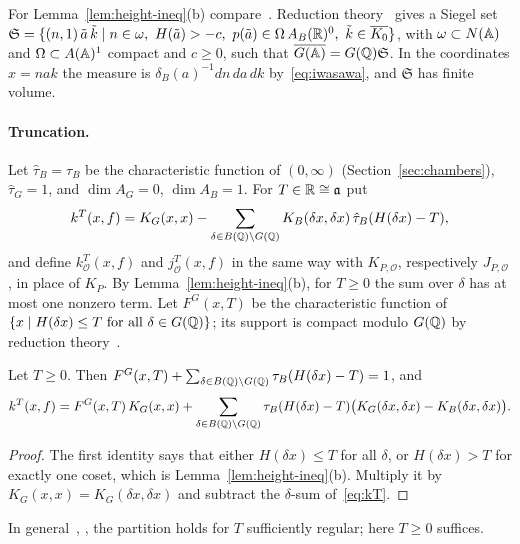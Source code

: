 For Lemma~\ref{lem:height-ineq}(b) compare~\cite[Lemma~5.1]{Ar78}.
Reduction theory~\cite{Go62} gives a Siegel set
$\mathfrak S=\{(n,1)\,\tilde a\,\tilde k\mid n\in\omega,\ H(\tilde a)>-c,\
p(\tilde a)\in\Omega\,A_B(\mathbb{R})^0,\ \tilde k\in\overline{K_0}\}$, with
$\omega\subset N(\mathbb{A})$ and $\Omega\subset A(\mathbb{A})^1$ compact and $c\ge0$, such
that $\overline{G(\mathbb{A})}=G(\mathbb{Q})\mathfrak S$. In the coordinates $x=nak$ the measure
is $\delta_B(a)^{-1}dn\,da\,dk$ by~\eqref{eq:iwasawa}, and $\mathfrak S$ has
finite volume.

\paragraph{Truncation.} Let $\hat\tau_B=\tau_B$ be the characteristic
function of $(0,\infty)$ (Section~\ref{sec:chambers}), $\hat\tau_G=1$, and
$\dim A_G=0$, $\dim A_B=1$. For $T\in\mathbb{R}\cong\mathfrak a$ put
\begin{equation}\label{eq:kT}
k^T(x,f)=K_G(x,x)-\sum_{\delta\in B(\mathbb{Q})\backslash G(\mathbb{Q})}
K_B(\delta x,\delta x)\,\hat\tau_B(H(\delta x)-T),
\end{equation}
and define $k^T_{\mathcal O}(x,f)$ and $j^T_{\mathcal O}(x,f)$ in the same
way with $K_{P,\mathcal O}$, respectively $J_{P,\mathcal O}$, in place of
$K_P$. By Lemma~\ref{lem:height-ineq}(b), for $T\ge0$ the sum over
$\delta$ has at most one nonzero term. Let $F^G(x,T)$ be the
characteristic function of $\{x\mid H(\delta x)\le T\ \text{for all}\
\delta\in G(\mathbb{Q})\}$; its support is compact modulo $G(\mathbb{Q})$ by reduction
theory~\cite{Go62}.

\begin{lemma}\label{lem:partition}
Let $T\ge0$. Then $F^G(x,T)+\sum_{\delta\in B(\mathbb{Q})\backslash G(\mathbb{Q})}
\tau_B(H(\delta x)-T)=1$, and
\begin{equation}\label{eq:kT-split}
k^T(x,f)=F^G(x,T)\,K_G(x,x)+\sum_{\delta\in B(\mathbb{Q})\backslash G(\mathbb{Q})}
\tau_B(H(\delta x)-T)\bigl(K_G(\delta x,\delta x)-K_B(\delta x,\delta x)\bigr).
\end{equation}
\end{lemma}

\begin{proof}
The first identity says that either $H(\delta x)\le T$ for all $\delta$,
or $H(\delta x)>T$ for exactly one coset, which is
Lemma~\ref{lem:height-ineq}(b). Multiply it by $K_G(x,x)=
K_G(\delta x,\delta x)$ and subtract the $\delta$-sum of~\eqref{eq:kT}.
\end{proof}

In general~\cite[\S6]{Ar78}, \cite[\S8]{Ar05}, the
partition holds for $T$ sufficiently regular; here $T\ge0$ suffices.

